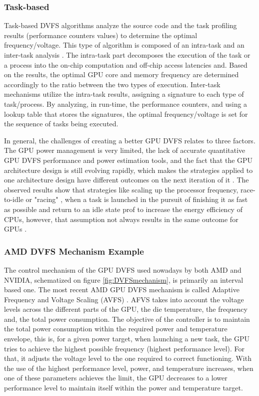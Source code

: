 \subsubsection{Task-based}

Task-based DVFS algorithms analyze the source code and the task profiling results (performance counters values) to determine the optimal frequency/voltage. This type of algorithm is composed of an intra-task and an inter-task analysis \cite{noauthor_time_nodate}. The intra-task part decomposes the execution of the task or a process into the on-chip computation and off-chip access latencies and. Based on the results,  the optimal GPU core and memory frequency are determined accordingly to the ratio between the two types of execution. Inter-task mechanisms utilize the intra-task results, assigning a signature to each type of task/process. By analyzing, in run-time, the performance counters, and using a lookup table that stores the signatures, the optimal frequency/voltage is set for the sequence of tasks being executed.

In general, the challenges of creating a better GPU DVFS relates to three factors. The GPU power management is very limited, the lack of accurate quantitative GPU DVFS performance and power estimation tools, and the fact that the GPU architecture design is still evolving rapidly, which makes the strategies applied to one architecture design have different outcomes on the next iteration of it \cite{mei_survey_2016}. The observed results show that strategies like scaling up the processor frequency, race-to-idle  \cite{hoffmann_racing_2013} or "racing" \cite{kim_racing_2015}, when a task is launched in the pursuit of finishing it as fast as possible and return to an idle state prof to increase the energy efficiency of CPUs, however, that assumption not always results in the same outcome for GPUs \cite{kim_racing_2015}. 

\subsubsection{AMD DVFS Mechanism Example}

The control mechanism of the GPU DVFS used nowadays by both AMD and NVIDIA, schematized on figure \ref{fig:DVFSmechanism}, is primarily an interval based one. The most recent AMD GPU DVFS mechanism is called Adaptive Frequency and Voltage Scaling (AVFS) \cite{amd_polaris_nodate}. AFVS takes into account the voltage levels across the different parts of the GPU, the die temperature, the frequency and, the total power consumption. The objective of the controller is to maintain the total power consumption within the required power and temperature envelope, this is, for a given power target, when launching a new task, the GPU tries to achieve the highest possible frequency (highest performance level). For that, it adjusts the voltage level to the one required to correct functioning. With the use of the highest performance level, power, and temperature increases, when one of these parameters achieves the limit, the GPU decreases to a lower performance level to maintain itself within the power and temperature target. 

